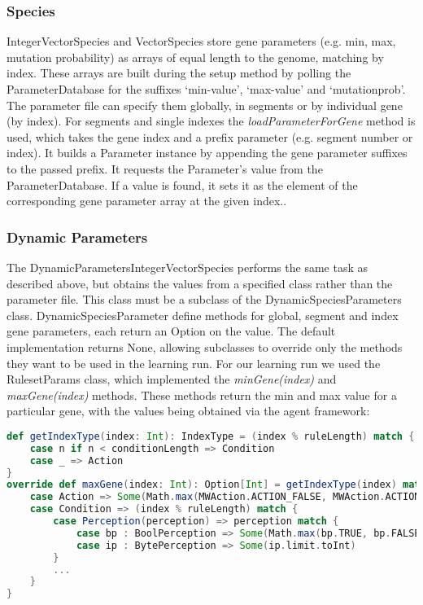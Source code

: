 \subsubsection{Species}

IntegerVectorSpecies and VectorSpecies store gene parameters (e.g. min, max, mutation probability) as arrays of equal length to the genome, matching by index. These arrays are built during the setup method by polling the ParameterDatabase for the suffixes `{\ttfamily min-value}', `{\ttfamily max-value}' and `{\ttfamily mutation\-prob}'. The parameter file can specify them globally, in segments or by individual gene (by index). For segments and single indexes the \emph{loadParameterForGene} method is used, which takes the gene index and a prefix parameter (e.g. segment number or index). It builds a Parameter instance by appending the gene parameter suffixes to the passed prefix. It requests the Parameter's value from the ParameterDatabase. If a value is found, it sets it as the element of the corresponding gene parameter array at the given index..

\subsubsection*{\hspace{6pt}Dynamic Parameters}

The DynamicParametersIntegerVectorSpecies performs the same task as described above, but obtains the values from a specified class rather than the parameter file. This class must be a subclass of the DynamicSpeciesParameters class. DynamicSpeciesParameter define methods for global, segment and index gene parameters, each return an Option on the value. The default implementation returns None, allowing subclasses to override only the methods they want to be used in the learning run. For our learning run we used the RulesetParams class, which implemented the \emph{minGene(index)} and \emph{maxGene(index)} methods. These methods return the min and max value for a particular gene, with the values being obtained via the agent framework:

\begin{minipage}{0.9\linewidth}
\centering
\begin{lstlisting}[language=scala]
def getIndexType(index: Int): IndexType = (index % ruleLength) match {
    case n if n < conditionLength => Condition
    case _ => Action
}
override def maxGene(index: Int): Option[Int] = getIndexType(index) match {
    case Action => Some(Math.max(MWAction.ACTION_FALSE, MWAction.ACTION_TRUE))
    case Condition => (index % ruleLength) match { 
        case Perception(perception) => perception match {
            case bp : BoolPerception => Some(Math.max(bp.TRUE, bp.FALSE))
            case ip : BytePerception => Some(ip.limit.toInt)
        }
        ...
    }
}
\end{lstlisting}
\end{minipage}


